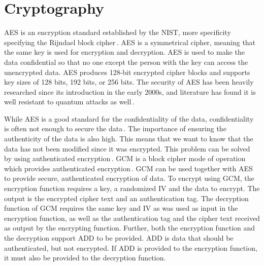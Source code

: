 \section{Cryptography}
\label{sec:back_crypto}
\gls{AES} is an encryption standard established by the \gls{NIST}, more specificity specifying the Rijndael block cipher\,\cite{kumarvermaPerformanceAnalysisRC62012}. \gls{AES} is a symmetrical cipher, meaning that the same key is used for encryption and decryption. \gls{AES} is used to make the data confidential so that no one except the person with the key can access the unencrypted data. \gls{AES} produces 128-bit encrypted cipher blocks and supports key sizes of 128 bits, 192 bits, or 256 bits. The security of \gls{AES} has been heavily researched since its introduction in the early 2000s, and literature has found it is well resistant to quantum attacks as well\,\cite{bonnetainQuantumSecurityAnalysis2019}.

While \gls{AES} is a good standard for the confidentiality of the data, confidentiality is often not enough to secure the data\,\cite{rosswallrabensteinWhenItComes2021}. The importance of ensuring the authenticity of the data is also high. This means that we want to know that the data has not been modified since it was encrypted. This problem can be solved by using authenticated encryption\,\cite{khovratovichAnswerWhyShould2013}. \gls{GCM} is a block cipher mode of operation which provides authenticated encryption\,\cite{mcgrewGaloisCounterMode2004}. \gls{GCM} can be used together with \gls{AES} to provide secure, authenticated encryption of data. To encrypt using \gls{GCM}, the encryption function requires a key, a randomized \gls{IV} and the data to encrypt. The output is the encrypted cipher text and an authentication tag. The decryption function of \gls{GCM} requires the same key and \gls{IV} as was used as input in the encryption function, as well as the authentication tag and the cipher text received as output by the encrypting function. Further, both the encryption function and the decryption support \gls{ADD} to be provided. \gls{ADD} is data that should be authenticated, but not encrypted. If \gls{ADD} is provided to the encryption function, it must also be provided to the decryption function.

